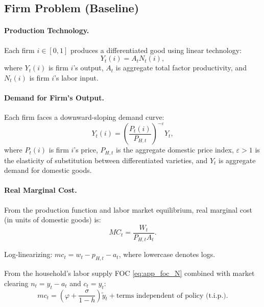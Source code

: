 \documentclass[12pt,a4paper]{article}
\begin{document}
\begin{appendices}
\subsection{Firm Problem (Baseline)}
\label{app:firms}

\paragraph{Production Technology.}
Each firm $i \in [0,1]$ produces a differentiated good using linear technology:
\begin{equation}
	Y_t(i) = A_t N_t(i),
	\label{eq:app_production}
\end{equation}
where $Y_t(i)$ is firm $i$'s output, $A_t$ is aggregate total factor productivity, and $N_t(i)$ is firm $i$'s labor input.

\paragraph{Demand for Firm's Output.}
Each firm faces a downward-sloping demand curve:
\begin{equation}
	Y_t(i) = \left(\frac{P_t(i)}{P_{H,t}}\right)^{-\varepsilon} Y_t,
	\label{eq:app_demand}
\end{equation}
where $P_t(i)$ is firm $i$'s price, $P_{H,t}$ is the aggregate domestic price index, $\varepsilon > 1$ is the elasticity of substitution between differentiated varieties, and $Y_t$ is aggregate demand for domestic goods.

\paragraph{Real Marginal Cost.}
From the production function and labor market equilibrium, real marginal cost (in units of domestic goods) is:
\begin{equation}
	MC_t = \frac{W_t}{P_{H,t} A_t}.
	\label{eq:app_mc}
\end{equation}

Log-linearizing: $mc_t = w_t - p_{H,t} - a_t$, where lowercase denotes logs.

From the household's labor supply FOC \eqref{eq:app_foc_N} combined with market clearing $n_t = y_t - a_t$ and $c_t = y_t$:
\begin{equation}
	mc_t = \left(\varphi + \frac{\sigma}{1-h}\right)\tilde{y}_t + \text{terms independent of policy (t.i.p.)}.
	\label{eq:app_mc_gap}
\end{equation}


\end{appendices}
\end{document}
